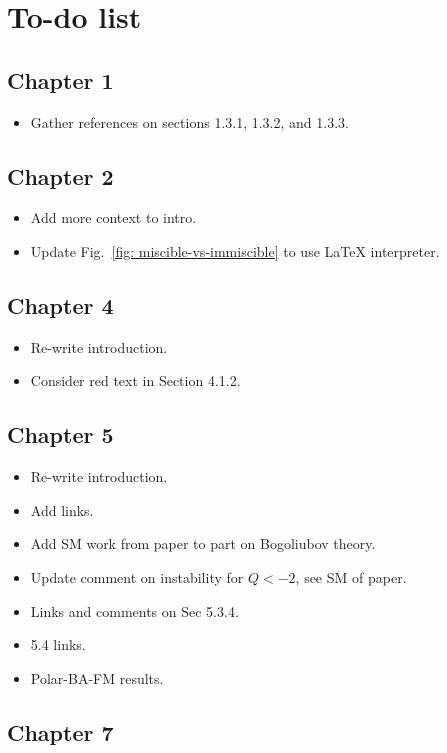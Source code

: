 \section{To-do list}

\subsection{Chapter 1}
\begin{itemize}
    \item Gather references on sections 1.3.1, 1.3.2, and 1.3.3.
\end{itemize}

\subsection{Chapter 2}
\begin{itemize}
    \item Add more context to intro.
    \item Update Fig.~\ref{fig: miscible-vs-immiscible} to use \LaTeX
          interpreter.
\end{itemize}

\subsection{Chapter 4}
\begin{itemize}
    \item Re-write introduction.
    \item Consider red text in Section 4.1.2.
\end{itemize}

\subsection{Chapter 5}
\begin{itemize}
    \item Re-write introduction.
    \item Add links.
    \item Add SM work from paper to part on Bogoliubov theory.
    \item Update comment on instability for \(Q < -2\), see SM of paper.
    \item Links and comments on Sec 5.3.4.
    \item 5.4 links.
    \item Polar-BA-FM results.
\end{itemize}

\subsection{Chapter 7}
